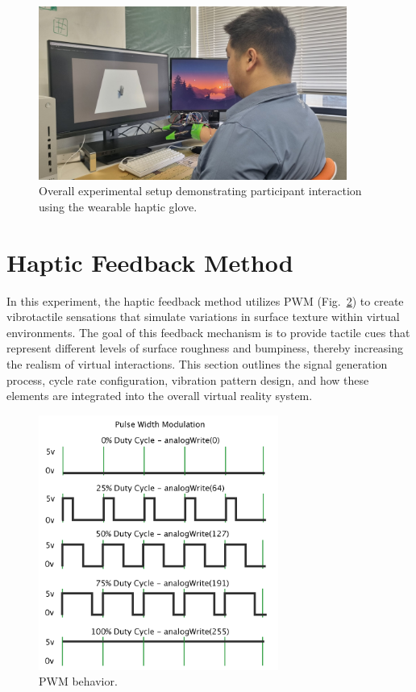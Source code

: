 \begin{figure}[H]\centering
	\includegraphics[width=0.9\textwidth]{Pictures/experiment.png}%
	\caption{Overall experimental setup demonstrating participant interaction using the wearable haptic glove.}\label{fig:experiment}%
	
\end{figure}

\newpage
\section{Haptic Feedback Method}

In this experiment, the haptic feedback method utilizes PWM (Fig.~\ref{fig:pwm_2}) to create vibrotactile sensations that simulate variations in surface texture within virtual environments. The goal of this feedback mechanism is to provide tactile cues that represent different levels of surface roughness and bumpiness, thereby increasing the realism of virtual interactions. This section outlines the signal generation process, cycle rate configuration, vibration pattern design, and how these elements are integrated into the overall virtual reality system.

\begin{figure}[H]\centering
	\includegraphics[width=0.7\textwidth]{Pictures/PWM_2.png}%
	\caption{PWM behavior.~\cite{pwm_doc}}\label{fig:pwm_2}%
	
\end{figure}


